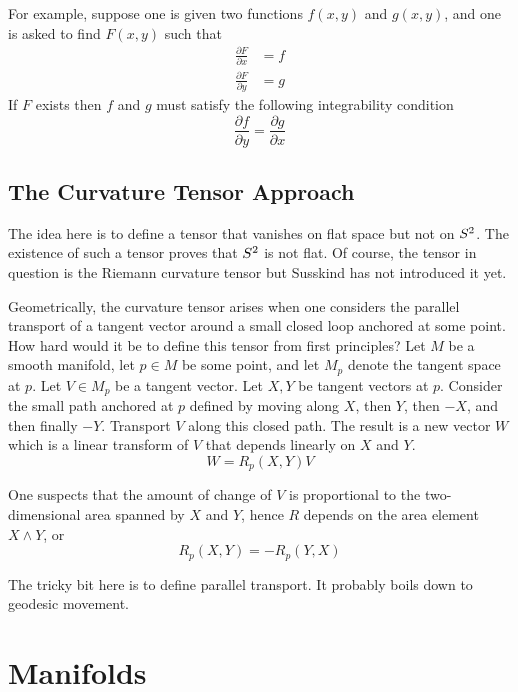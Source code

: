\documentclass[11pt, oneside]{article}
\begin{document}
For example, suppose one is given two functions $f(x,y)$ and $g(x,y)$, and one is asked to find $F(x,y)$ such that
\begin{align}
	\frac{\partial F}{\partial x}	&= f \\
	\frac{\partial F}{\partial y}	&= g
\end{align}
If $F$ exists then $f$ and $g$ must satisfy the following integrability condition
\begin{equation}
	\frac{\partial f}{\partial y} = \frac{\partial g}{\partial x}
\end{equation}

\subsection{The Curvature Tensor Approach}

The idea here is to define a tensor that vanishes on flat space but not on $S^2$.
The existence of such a tensor proves that $S^2$ is not flat.
Of course, the tensor in question is the Riemann curvature tensor but Susskind has not introduced it yet.

Geometrically, the curvature tensor arises when one considers the parallel transport of a tangent vector around a
small closed loop anchored at some point.
How hard would it be to define this tensor from first principles?
Let $M$ be a smooth manifold, let $p \in M$ be some point, and let $M_p$ denote the tangent space at $p$.
Let $V \in M_p$ be a tangent vector.
Let $X, Y$ be tangent vectors at $p$.
Consider the small path anchored at $p$ defined by moving along $X$, then $Y$, then $-X$, and then finally $-Y$.
Transport $V$ along this closed path.
The result is a new vector $W$ which is a linear transform of $V$ that depends linearly on $X$ and $Y$.
\begin{equation}
	W = R_p(X,Y)V
\end{equation}

One suspects that the amount of change of $V$ is proportional to the two-dimensional area spanned by $X$ and $Y$, hence $R$ depends
on the area element $X \wedge Y$, or 
\begin{equation}
	R_p(X,Y) = -R_p(Y,X)
\end{equation}

The tricky bit here is to define parallel transport.
It probably boils down to geodesic movement.

\section{Manifolds}
\end{document}
